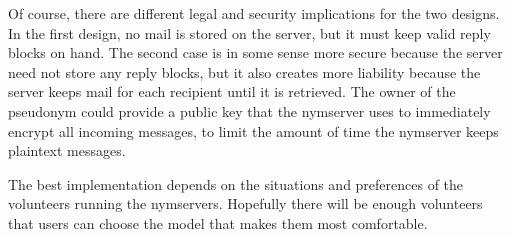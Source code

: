 \documentclass{llncs}
\renewcommand\url{\begingroup \def\UrlLeft{<}\def\UrlRight{>}\urlstyle{tt}\Url}
\begin{document}
Of course, there are different legal and security implications for the two
designs. In the first design, no mail is stored on the server, but it must
keep valid reply blocks on hand. The second case is in some sense more
secure because the server need not store any reply blocks, but it also
creates more liability because the server keeps mail for each recipient
until it is retrieved. The owner of the pseudonym could provide a public
key that the nymserver uses to immediately encrypt all incoming messages,
to limit the amount of time the nymserver keeps plaintext messages.

The best implementation depends on the situations and preferences of
the volunteers running the nymservers. Hopefully there will be enough
volunteers that users can choose the model that makes them most
comfortable.


%
%
%
%
%

\end{document}
